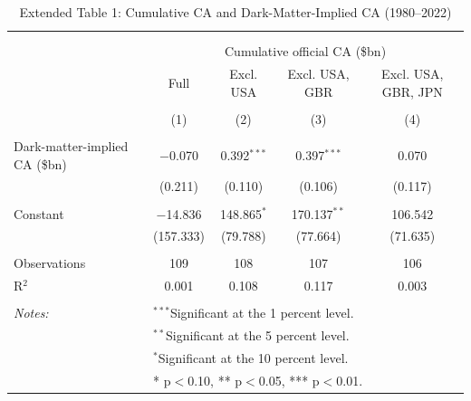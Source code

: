 \documentclass[11pt]{article}
\begin{document}
\small
\setcounter{table}{0}

\renewcommand{\thetable}{E1}
\begin{table}[!htbp] \centering 
  \caption{Extended Table 1: Cumulative CA and Dark-Matter-Implied CA (1980--2022)} 
  \label{tab:E1_extended} 
\begin{tabular}{@{\extracolsep{5pt}}lcccc} 
\\[-1.8ex]\hline 
\hline \\[-1.8ex] 
\\[-1.8ex] & \multicolumn{4}{c}{Cumulative official CA (\$bn)} \\ 
 & Full & Excl. USA & Excl. USA, GBR & Excl. USA, GBR, JPN \\ 
\\[-1.8ex] & (1) & (2) & (3) & (4)\\ 
\hline \\[-1.8ex] 
 Dark-matter-implied CA (\$bn) & $-$0.070 & 0.392$^{***}$ & 0.397$^{***}$ & 0.070 \\ 
  & (0.211) & (0.110) & (0.106) & (0.117) \\ 
  & & & & \\ 
 Constant & $-$14.836 & 148.865$^{*}$ & 170.137$^{**}$ & 106.542 \\ 
  & (157.333) & (79.788) & (77.664) & (71.635) \\ 
  & & & & \\ 
Observations & 109 & 108 & 107 & 106 \\ 
R$^{2}$ & 0.001 & 0.108 & 0.117 & 0.003 \\ 
\hline \\[-1.8ex] 
\textit{Notes:} & \multicolumn{4}{l}{$^{***}$Significant at the 1 percent level.} \\ 
 & \multicolumn{4}{l}{$^{**}$Significant at the 5 percent level.} \\ 
 & \multicolumn{4}{l}{$^{*}$Significant at the 10 percent level.} \\ 
 & \multicolumn{4}{l}{* p$<$0.10, ** p$<$0.05, *** p$<$0.01.} \\ 
\end{tabular} 
\end{table} 
\end{document}
